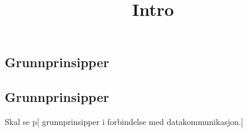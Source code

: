 \documentclass{article}
\title{Intro}
\begin{document}
    \begin{flushleft}
        \section{Grunnprinsipper}

        \subsection{Grunnprinsipper}
        Skal se p[ grunnprinsipper i forbindelse med datakommunikasjon.]
        

    \end{flushleft}
\end{document}
